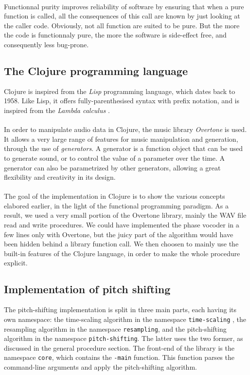 \documentclass[letterpaper]{article}
\newcommand*{\codeinl}{\texttt}
\theoremstyle{definition}
\theoremstyle{remark}
\begin{document}
\paragraph{}
Functionnal purity improves reliability of software by ensuring that when a pure
function is called, all the consequences of this call are known by just looking
at the caller code. Obviously, not all function are suited to be pure. But the
more the code is functionnaly pure, the more the software is side-effect free,
and consequently less bug-prone.

\subsection{The Clojure programming language}
Clojure is inspired from the \emph{Lisp} programming language, which dates back
to 1958. Like Lisp, it offers fully-parenthesised syntax with prefix notation,
and is inspired from the \emph{Lambda calculus} \citep{Rojas_atutorial}.

\paragraph{}
In order to manipulate audio data in Clojure, the music library \emph{Overtone}
is used. It allows a very large range of features for music manipulation and
generation, through the use of \emph{generators}. A generator is a function
object that can be used to generate sound, or to control the value of a
parameter over the time. A generator can also be parametrized by other
generators, allowing a great flexibility and creativity in its design.

\paragraph{}
The goal of the implementation in Clojure is to show the various concepts
elabored earlier, in the light of the functional programming paradigm. As a
result, we used a very small portion of the Overtone library, mainly the WAV
file read and write procedures. We could have implemented the phase vocoder in a
few lines only with Overtone, but the juicy part of the algorithm would have
been hidden behind a library function call. We then choosen to mainly use the
built-in features of the Clojure language, in order to make the whole procedure
explicit.

\subsection{Implementation of pitch shifting}
The pitch-shifting implementation is split in three main parts, each having its
own namespace: the time-scaling algorithm in the namespace
\codeinl{time-scaling} , the resampling algorithm in the namespace
\codeinl{resampling}, and the pitch-shifting algorithm in the namespace
\codeinl{pitch-shifting}. The latter uses the two former, as discussed in the
general procedure section. The front-end of the library is the namespace
\codeinl{core}, which contains the \codeinl{-main} function. This function
parses the command-line arguments and apply the pitch-shifting algorithm.
\end{document}
